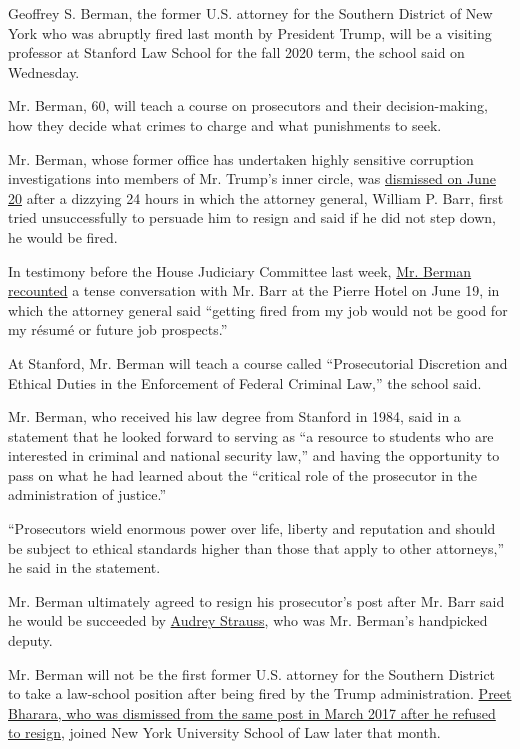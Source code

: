 Geoffrey S. Berman, the former U.S. attorney for the Southern District
of New York who was abruptly fired last month by President Trump, will
be a visiting professor at Stanford Law School for the fall 2020 term,
the school said on Wednesday.

Mr. Berman, 60, will teach a course on prosecutors and their
decision-making, how they decide what crimes to charge and what
punishments to seek.

Mr. Berman, whose former office has undertaken highly sensitive
corruption investigations into members of Mr. Trump's inner circle, was
\href{https://www.nytimes.com/2020/06/20/nyregion/trump-geoffrey-berman-fired-sdny.html}{dismissed
on June 20} after a dizzying 24 hours in which the attorney general,
William P. Barr, first tried unsuccessfully to persuade him to resign
and said if he did not step down, he would be fired.

In testimony before the House Judiciary Committee last week,
\href{https://www.nytimes.com/2020/07/09/us/politics/top-manhattan-prosecutor-ousted-by-trump-details-firing.html}{Mr.
Berman recounted} a tense conversation with Mr. Barr at the Pierre Hotel
on June 19, in which the attorney general said ``getting fired from my
job would not be good for my résumé or future job prospects.''

At Stanford, Mr. Berman will teach a course called ``Prosecutorial
Discretion and Ethical Duties in the Enforcement of Federal Criminal
Law,'' the school said.

Mr. Berman, who received his law degree from Stanford in 1984, said in a
statement that he looked forward to serving as ``a resource to students
who are interested in criminal and national security law,'' and having
the opportunity to pass on what he had learned about the ``critical role
of the prosecutor in the administration of justice.''

``Prosecutors wield enormous power over life, liberty and reputation and
should be subject to ethical standards higher than those that apply to
other attorneys,'' he said in the statement.

Mr. Berman ultimately agreed to resign his prosecutor's post after Mr.
Barr said he would be succeeded by
\href{https://www.nytimes.com/2020/06/21/nyregion/us-attorney-trump-audrey-strauss.html}{Audrey
Strauss}, who was Mr. Berman's handpicked deputy.

Mr. Berman will not be the first former U.S. attorney for the Southern
District to take a law-school position after being fired by the Trump
administration.
\href{https://www.nytimes.com/2017/03/21/nyregion/preet-bharara-nyu-law-school.html}{Preet
Bharara, who was dismissed from the same post in March 2017 after he
refused to resign}, joined New York University School of Law later that
month.

